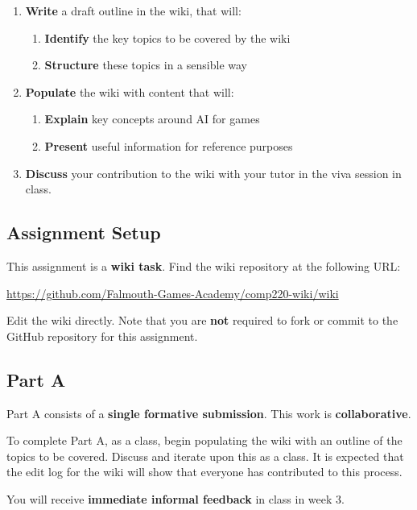 \documentclass{../../fal_assignment}
\begin{document}
	\begin{enumerate}[label=(\Alph*)]
		\item \textbf{Write} a draft outline in the wiki, that will:
		\begin{enumerate}[label=(\roman*)]
			\item \textbf{Identify} the key topics to be covered by the wiki
			\item \textbf{Structure} these topics in a sensible way
		\end{enumerate}
		\item \textbf{Populate} the wiki with content that will:
		\begin{enumerate}[label=(\roman*)]
			\item \textbf{Explain} key concepts around AI for games
			\item \textbf{Present} useful information for reference purposes
		\end{enumerate}
		\item \textbf{Discuss} your contribution to the wiki with your tutor in the viva session in class.
	\end{enumerate}
	
	\subsection*{Assignment Setup}
	
	This assignment is a \textbf{wiki task}. Find the wiki repository at the following URL:
	
	\indent \url{https://github.com/Falmouth-Games-Academy/comp220-wiki/wiki}
	
	Edit the wiki directly. Note that you are \textbf{not} required to fork or commit to the GitHub repository
	for this assignment.
	
	\subsection*{Part A}
	
	Part A consists of a \textbf{single formative submission}. This work is \textbf{collaborative}.
	
	To complete Part A, as a class, begin populating the wiki with an outline of the topics to be covered.
	Discuss and iterate upon this as a class.
	It is expected that the edit log for the wiki will show that everyone has contributed to this process.
	
	You will receive \textbf{immediate informal feedback} in class in week 3.
	
\end{document}
